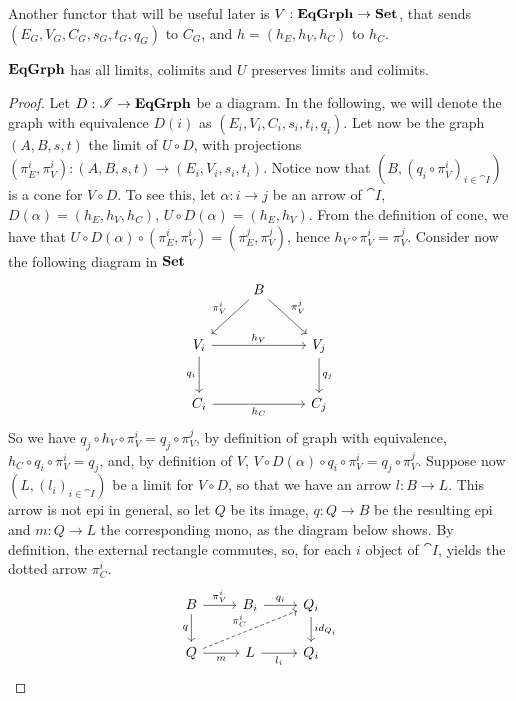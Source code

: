 Another functor that will be useful later is $V: \mathbf{EqGrph} \to \mathbf{Set}$, that sends $(E_G, V_G, C_G, s_G, t_G, q_G)$ to $C_G$, and $h = (h_E, h_V, h_C)$ to $h_C$.

\begin{prop}\label{prop:eqgrph_complete}
    $\mathbf{EqGrph}$ has all limits, colimits and $U$ preserves limits and colimits.
\end{prop}

\begin{proof}
    Let $D : \mathscr{I} \to \mathbf{EqGrph}$ be a diagram. In the following, we will denote the graph with equivalence $D(i)$ as $(E_i, V_i, C_i, s_i, t_i, q_i)$.
    Let now be the graph $(A, B, s, t)$ the limit of $U \circ D$, with projections $(\pi_E^i, \pi_V^i):(A, B, s, t) \to (E_i, V_i, s_i, t_i)$. Notice now that $(B, (q_i\circ \pi_V^i)_{i \in \cat I})$ is a cone for $V \circ D$. To see this, let $\alpha : i \to j$ be an arrow of $\cat I$, $D(\alpha) = (h_E, h_V, h_C)$, $U \circ D (\alpha) = (h_E, h_V)$. From the definition of cone, we have that $U \circ D (\alpha) \circ (\pi_E^i, \pi_V^i) = (\pi_E^j, \pi_V^j)$, hence $h_V \circ \pi_V^i = \pi_V^j$. 
    Consider now the following diagram in $\mathbf{Set}$
    \[
        \begin{tikzcd}[row sep=25 pt, column sep = 25 pt]
            & B \arrow[dl, "{\pi_V^i}"swap] \arrow[dr, "{\pi_V^j}"] & \\
            V_i \arrow[rr, "{h_V}"] \arrow[d, "{q_i}" swap] & & V_j \arrow[d, "{q_j}"] \\
            C_i \arrow[rr, "{h_C}" swap] & & C_j 
        \end{tikzcd}
    \]
    So we have $q_j \circ h_V \circ \pi_V^i = q_j \circ \pi_V^j$, by definition of graph with equivalence, $h_C \circ q_i \circ \pi_V^i = q_j$, and, by definition of $V$, $V \circ D (\alpha) \circ q_i \circ \pi_V^i = q_j \circ \pi_V^j$.
    Suppose now $(L, (l_i)_{i \in \cat I})$ be a limit for $V \circ D$, so that we have an arrow $l: B \to L$. This arrow is not epi in general, so let $Q$ be its image, $q: Q \to B$ be the resulting epi and $m: Q \to L$ the corresponding mono, as the diagram below shows. By definition, the external rectangle commutes, so, for each $i$ object of $\cat I$,  yields the dotted arrow $\pi_C^i$.
    \[
        \begin{tikzcd}
            B \arrow[r, "{\pi_V^i}"] \arrow[d, "q" swap] & B_ i \arrow[r, "{q_i}"] & Q_i \arrow[d, "{id_{Q_i}}"] \\
            Q \arrow[urr, dashed, "\pi_C^i"] \arrow[r, "m" swap] &L \arrow[r, "{l_i}"swap] & Q_i

\end{tikzcd}\]
\end{proof}
